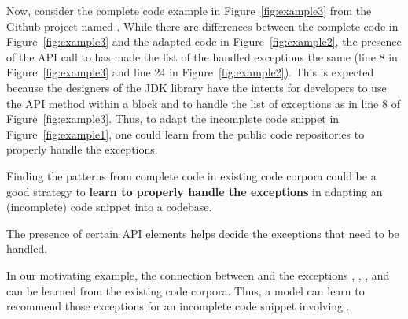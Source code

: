 





Now, consider the complete code example in Figure~\ref{fig:example3}
from the Github project named . While there are
differences between the complete code in Figure~\ref{fig:example3} and
the adapted code in Figure~\ref{fig:example2}, the presence of the API
call to  has made the list of the handled
exceptions the same (line 8 in Figure~\ref{fig:example3} and line 24
in Figure~\ref{fig:example2}). This is expected because the designers
of the JDK library have the intents for developers to use the API
method  within a  block and
to handle the list of exceptions as in line 8 of
Figure~\ref{fig:example3}. Thus, to adapt the incomplete code snippet
in Figure~\ref{fig:example1}, one could learn from the public code
repositories to properly handle the exceptions.

\begin{Observation} 
Finding the patterns from complete code in existing code corpora could
be a good strategy to {\bf learn to properly handle the exceptions} in
adapting an (incomplete) code snippet into a codebase.
\end{Observation}


\begin{Observation} 
The presence of certain API elements helps decide the exceptions that
need to be handled.
\end{Observation}

In our motivating example, the connection between
 and the exceptions
, ,
, and
 can be learned from the existing
code corpora. Thus, a model can learn to recommend those exceptions
for an incomplete code snippet involving .

